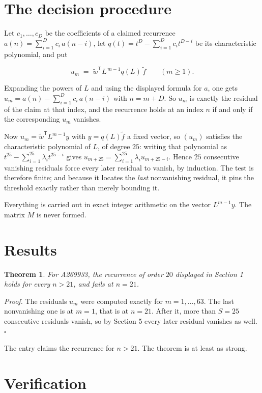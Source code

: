 \documentclass[11pt]{article}
\newtheorem{theorem}{Theorem}
\theoremstyle{definition}
\begin{document}
\section{The decision procedure}

Let $c_1,\dots,c_D$ be the coefficients of a claimed recurrence $a(n) = \sum_{i=1}^{D} c_i\,a(n-i)$, let $q(t) = t^{D} - \sum_{i=1}^{D} c_i t^{D-i}$ be its characteristic polynomial, and put

\[u_m \;=\; \tilde w^{\mathsf T} L^{\,m-1} q(L)\,\tilde f \qquad (m \ge 1).\]

Expanding the powers of $L$ and using the displayed formula for $a$, one gets $u_m = a(n) - \sum_{i=1}^{D} c_i\,a(n-i)$ with $n = m + D$. So $u_m$ is exactly the residual of the claim at that index, and the recurrence holds at an index $n$ if and only if the corresponding $u_m$ vanishes.

Now $u_m = \tilde w^{\mathsf T} L^{m-1} y$ with $y = q(L)\tilde f$ a fixed vector, so $(u_m)$ satisfies the characteristic polynomial of $L$, of degree $25$: writing that polynomial as $t^{25} - \sum_{i=1}^{25} \lambda_i t^{25-i}$ gives $u_{m+25} = \sum_{i=1}^{25} \lambda_i u_{m+25-i}$. Hence $25$ consecutive vanishing residuals force every later residual to vanish, by induction. The test is therefore finite; and because it locates the {\itshape last} nonvanishing residual, it pins the threshold exactly rather than merely bounding it.

Everything is carried out in exact integer arithmetic on the vector $L^{m-1}y$. The matrix $M$ is never formed.

\section{Results}

\begin{theorem} For A269933, the recurrence of order $20$ displayed in Section 1 holds for every $n > 21$, and fails at $n = 21$.\end{theorem}

{\itshape Proof.} The residuals $u_m$ were computed exactly for $m = 1,\dots,63$. The last nonvanishing one is at $m = 1$, that is at $n = 21$. After it, more than $S = 25$ consecutive residuals vanish, so by Section 5 every later residual vanishes as well. $\square$

The entry claims the recurrence for $n > 21$. The theorem is at least as strong.

\section{Verification}
\end{document}
